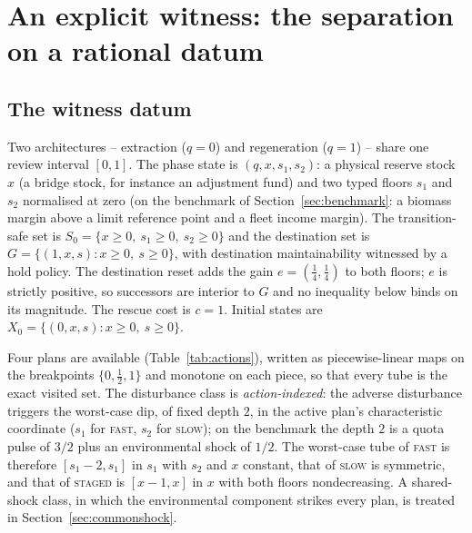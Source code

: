 \documentclass[preprint,11pt,authoryear]{elsarticle}
\theoremstyle{definition}
\theoremstyle{remark}
\newcommand{\act}[1]{\textsc{#1}}
\begin{document}
\section{An explicit witness: the separation on a rational datum}\label{sec:witness}

\subsection{The witness datum}\label{sec:datum}

Two architectures -- extraction ($q=0$) and regeneration ($q=1$) -- share one review interval $[0,1]$. The phase state is $(q,x,s_1,s_2)$: a physical reserve stock $x$ (a bridge stock, for instance an adjustment fund) and two typed floors $s_1$ and $s_2$ normalised at zero (on the benchmark of Section~\ref{sec:benchmark}: a biomass margin above a limit reference point and a fleet income margin). The transition-safe set is $S_0=\{x\ge0,\ s_1\ge0,\ s_2\ge0\}$ and the destination set is $G=\{(1,x,s):x\ge0,\ s\ge0\}$, with destination maintainability witnessed by a hold policy. The destination reset adds the gain $e=(\tfrac14,\tfrac14)$ to both floors; $e$ is strictly positive, so successors are interior to $G$ and no inequality below binds on its magnitude. The rescue cost is $c=1$. Initial states are $X_0=\{(0,x,s):x\ge0,\ s\ge0\}$.

Four plans are available (Table~\ref{tab:actions}), written as piecewise-linear maps on the breakpoints $\{0,\tfrac12,1\}$ and monotone on each piece, so that every tube is the exact visited set. The disturbance class is \emph{action-indexed}: the adverse disturbance triggers the worst-case dip, of fixed depth $2$, in the active plan's characteristic coordinate ($s_1$ for \act{fast}, $s_2$ for \act{slow}); on the benchmark the depth $2$ is a quota pulse of $3/2$ plus an environmental shock of $1/2$. The worst-case tube of \act{fast} is therefore $[s_1-2,s_1]$ in $s_1$ with $s_2$ and $x$ constant, that of \act{slow} is symmetric, and that of \act{staged} is $[x-1,x]$ in $x$ with both floors nondecreasing. A shared-shock class, in which the environmental component strikes every plan, is treated in Section~\ref{sec:commonshock}.
\end{document}
